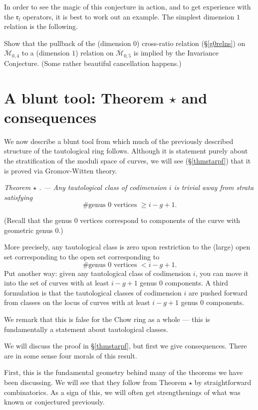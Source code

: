 \documentclass[12pt,letterpaper]{amsart}
\newcommand{\tpoint}[1]{\vspace{3mm}\par \noindent \refstepcounter{subsection}{\bf \thesubsection.} 
  {\em #1. ---} }
\newcommand{\cm}{{\mathcal{M}}}
\newcommand{\cmbar}{\overline{\cm}}
\newcommand{\fr}{\mathfrak{r}}
\newcommand{\lremind}[1]{{\bf[label:  #1]}}
\renewcommand{\lremind}[1]{{}}
\begin{document}
{In order to see the magic of this conjecture in action, and to get
experience with the $\fr_l$ operators, it is best to work out an
example.  The simplest dimension $1$ relation is the following.

Show that the pullback of the (dimension $0$) cross-ratio relation 
(\S \ref{g0relns}) on
$\cmbar_{0,4}$ to a (dimension $1$) relation on $\cmbar_{0,5}$ is
implied by the Invariance Conjecture.  (Some rather beautiful cancellation
happens.)




\section{A blunt tool:  Theorem $\star$ and consequences}

We now describe a blunt tool from which much  of the previously
described structure of the tautological ring follows.
Although it is statement purely about the stratification of the moduli
space of curves, we will see (\S \ref{thmstarpf}) that it is proved via Gromov-Witten theory.

\tpoint{Theorem $\star$ \cite{thmstar}} 
{\em  Any tautological class of codimension $i$
is trivial away from strata satisfying\label{thmstarhere}\lremind{thmstarhere}
$$
\boxed{{\text {\# genus $0$ vertices  }} \geq i-g+1.}
$$}


(Recall that the genus $0$ vertices correspond to components
of the curve with geometric genus $0$.)

More precisely, any tautological class is zero upon restriction to the
(large) open set corresponding to 
the  open set corresponding to
$${\text {\# genus $0$ vertices  }} < i-g+1.$$
Put another way:  given any tautological class of codimension $i$,
you can move it into the set of curves with at least $i-g+1$ genus $0$ components.
A third formulation is that the tautological classes of codimension $i$
are pushed forward from classes on the locus of curves with
at least $i-g+1$ genus $0$ components.


We remark that this is false for the Chow ring as a whole ---
this is fundamentally a statement about tautological classes.

We will discuss the proof in \S \ref{thmstarpf}, but first we give consequences.
There are in some sense four morals of this result.

First, this is the fundamental geometry behind many of the theorems
we have been discussing.  We will see that  they follow from Theorem $\star$ by
straightforward combinatorics.  As a sign of this, we will
often get strengthenings of what was known or conjectured previously.

}
\end{document}
